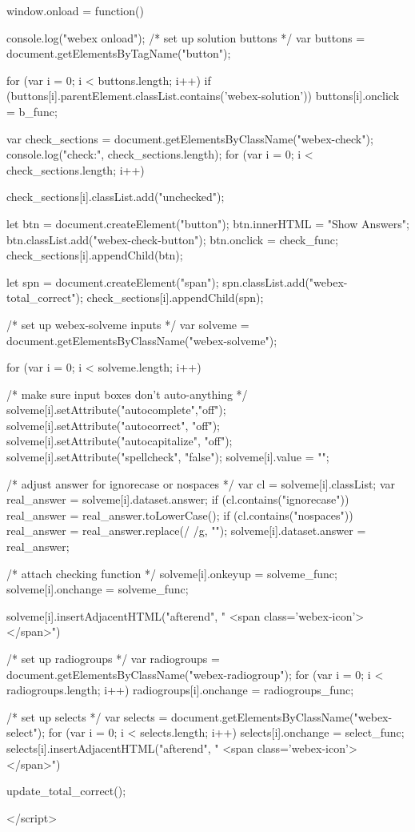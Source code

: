 \documentclass[
  ignorenonframetext,
]{beamer}
\begin{document}
window.onload = function() {
  console.log("webex onload");
  /* set up solution buttons */
  var buttons = document.getElementsByTagName("button");

  for (var i = 0; i < buttons.length; i++) {
    if (buttons[i].parentElement.classList.contains('webex-solution')) {
      buttons[i].onclick = b_func;
    }
  }

  var check_sections = document.getElementsByClassName("webex-check");
  console.log("check:", check_sections.length);
  for (var i = 0; i < check_sections.length; i++) {
    check_sections[i].classList.add("unchecked");

    let btn = document.createElement("button");
    btn.innerHTML = "Show Answers";
    btn.classList.add("webex-check-button");
    btn.onclick = check_func;
    check_sections[i].appendChild(btn);

    let spn = document.createElement("span");
    spn.classList.add("webex-total_correct");
    check_sections[i].appendChild(spn);
  }

  /* set up webex-solveme inputs */
  var solveme = document.getElementsByClassName("webex-solveme");

  for (var i = 0; i < solveme.length; i++) {
    /* make sure input boxes don't auto-anything */
    solveme[i].setAttribute("autocomplete","off");
    solveme[i].setAttribute("autocorrect", "off");
    solveme[i].setAttribute("autocapitalize", "off");
    solveme[i].setAttribute("spellcheck", "false");
    solveme[i].value = "";

    /* adjust answer for ignorecase or nospaces */
    var cl = solveme[i].classList;
    var real_answer = solveme[i].dataset.answer;
    if (cl.contains("ignorecase")) {
      real_answer = real_answer.toLowerCase();
    }
    if (cl.contains("nospaces")) {
      real_answer = real_answer.replace(/ /g, "");
    }
    solveme[i].dataset.answer = real_answer;

    /* attach checking function */
    solveme[i].onkeyup = solveme_func;
    solveme[i].onchange = solveme_func;

    solveme[i].insertAdjacentHTML("afterend", " <span class='webex-icon'></span>")
  }

  /* set up radiogroups */
  var radiogroups = document.getElementsByClassName("webex-radiogroup");
  for (var i = 0; i < radiogroups.length; i++) {
    radiogroups[i].onchange = radiogroups_func;
  }

  /* set up selects */
  var selects = document.getElementsByClassName("webex-select");
  for (var i = 0; i < selects.length; i++) {
    selects[i].onchange = select_func;
    selects[i].insertAdjacentHTML("afterend", " <span class='webex-icon'></span>")
  }

  update_total_correct();
}

</script>
\end{document}
